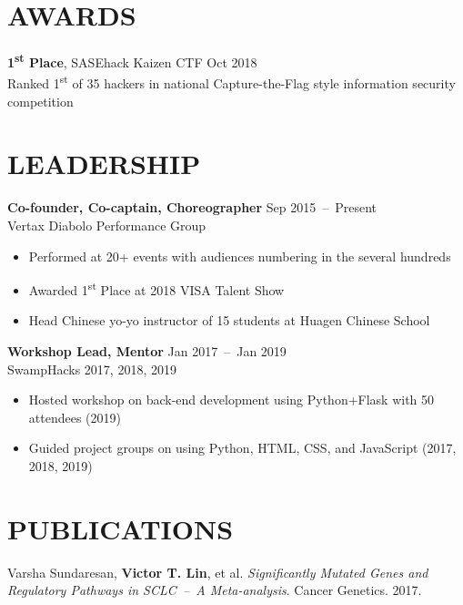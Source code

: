 \documentclass[line,resmargin]{res}
\begin{document}
\begin{resume}
\section{AWARDS}
    \textbf{1\textsuperscript{st} Place}, SASEhack Kaizen CTF    \hfill Oct 2018 \\
    Ranked 1\textsuperscript{st} of 35 hackers in national Capture-the-Flag style information security competition

\section{LEADERSHIP}
    \textbf{Co-founder, Co-captain, Choreographer}    \hfill Sep 2015~--~Present \\
    Vertax Diabolo Performance Group
    \begin{itemize}  \itemsep -2pt
        \item Performed at 20+ events with audiences numbering in the several hundreds
        \item Awarded 1\textsuperscript{st} Place at 2018 VISA Talent Show
        \item Head Chinese yo-yo instructor of 15 students at Huagen Chinese School
    \end{itemize}

    \textbf{Workshop Lead, Mentor}    \hfill Jan 2017~--~Jan 2019 \\
    SwampHacks 2017, 2018, 2019
    \begin{itemize}  \itemsep -2pt
        \item Hosted workshop on back-end development using Python+Flask with 50 attendees (2019)
        \item Guided project groups on using Python, HTML, CSS, and JavaScript (2017, 2018, 2019)
    \end{itemize}


\section{PUBLICATIONS}
    Varsha Sundaresan, \textbf{Victor T. Lin}, et al.
    \textit{Significantly Mutated Genes and Regulatory Pathways in SCLC~--~A Meta-analysis}. Cancer Genetics. 2017.

\end{resume}
\end{document}
